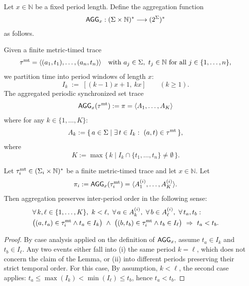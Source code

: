   \begin{definition}
  Let $x \in \mathbb{N}$ be a fixed period length.
  Define the aggregation function
  \[
  \mathsf{AGG}_{x} : (\Sigma \times \mathbb{N})^{*} \longrightarrow (2^{\Sigma})^{*}
  \]
  as follows.
  
  Given a finite metric-timed trace
  \[
  \tau^{\mathrm{mt}} = \langle (a_1,t_1),\dots,(a_n,t_n) \rangle 
  \quad\text{with } a_j \in \Sigma,\ t_j \in \mathbb{N}\ \text{for all } j\in\{1,\dots,n\},
  \]
  we partition time into period windows of length $x$:
  \[
    I_k \;:=\;
    [(k-1)x + 1,\ kx]
    \qquad (k \ge 1).
  \]
  The aggregated periodic synchronized set trace
  \[
  \mathsf{AGG}_x(\tau^{\mathrm{mt}}) := \pi = \langle A_1,\dots,A_K \rangle 
  \]
  where for any $k\in\{1,\dots,K\}$:
  \[
  A_k := \{\, a \in \Sigma \mid \exists\, t \in I_k:\ (a,t) \in \tau^{\mathrm{mt}} \,\},
  \]
  where
  \[
  K := \max\{\, k \mid I_k \cap \{t_1,\dots,t_n\} \neq \emptyset \,\}.
  \]
  \end{definition}
  


\begin{lemma}
\label{lem:agg-to-periodic}
Let $\tau^{\mathrm{mt}}_i \in (\Sigma_i \times \mathbb{N})^{*}$ be a finite metric-timed trace and let $x \in \mathbb{N}$.
Let
\[
\pi_i := \mathsf{AGG}_x(\tau^{\mathrm{mt}}_i) = \langle A^{(i)}_1,\dots,A^{(i)}_K \rangle .
\]
Then aggregation preserves inter-period order in the following sense:
\begin{align*}
&\forall\, k,\ell \in \{1,\dots,K\},\ k<\ell,\
\forall\, a \in A^{(i)}_k,\ \forall\, b \in A^{(i)}_{\ell},\
\forall\, t_a,t_b:\\&
\bigl((a,t_a)\in\tau^{\mathrm{mt}}_i \land t_a\in I_k\bigr)\ \land\
\bigl((b,t_b)\in\tau^{\mathrm{mt}}_i \land t_b\in I_{\ell}\bigr)
\ \Rightarrow\ t_a<t_b.
\end{align*}
\end{lemma}

\begin{proof}
 By case analysis applied on the definition of $\mathsf{AGG}_x$, assume $t_a \in I_k$ and $t_b \in I_{\ell}$. Any two events either fall into  (i) the same period $k=\ell$, which does not concern the claim of the Lemma,  or (ii) into different periods preserving their strict temporal order.  For this case, By assumption,  $k < \ell$, the second case applies: $t_a \le \max(I_k) < \min(I_{\ell}) \le t_b$, hence $t_a < t_b$.
 \end{proof}

